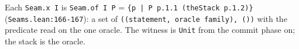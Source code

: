 Each \texttt{Seam.\allowbreak{}x I} is \texttt{Seam.\allowbreak{}of I P} = \texttt{\{\allowbreak{}p\allowbreak{} |\allowbreak{} P\allowbreak{} p\allowbreak{}.\allowbreak{}1\allowbreak{}.\allowbreak{}1\allowbreak{} (\allowbreak{}t\allowbreak{}h\allowbreak{}e\allowbreak{}S\allowbreak{}t\allowbreak{}a\allowbreak{}c\allowbreak{}k\allowbreak{} p\allowbreak{}.\allowbreak{}1\allowbreak{}.\allowbreak{}2\allowbreak{})\allowbreak{}\}} (\texttt{Seams.\allowbreak{}lean:166-{}167}): a set of \texttt{(\allowbreak{}(\allowbreak{}s\allowbreak{}t\allowbreak{}a\allowbreak{}t\allowbreak{}e\allowbreak{}m\allowbreak{}e\allowbreak{}n\allowbreak{}t\allowbreak{},\allowbreak{} o\allowbreak{}r\allowbreak{}a\allowbreak{}c\allowbreak{}l\allowbreak{}e\allowbreak{} f\allowbreak{}a\allowbreak{}m\allowbreak{}i\allowbreak{}l\allowbreak{}y\allowbreak{})\allowbreak{},\allowbreak{} (\allowbreak{})\allowbreak{})} with the predicate read on the one oracle. The witness is \texttt{Unit} from the commit phase on; the stack is the oracle.

